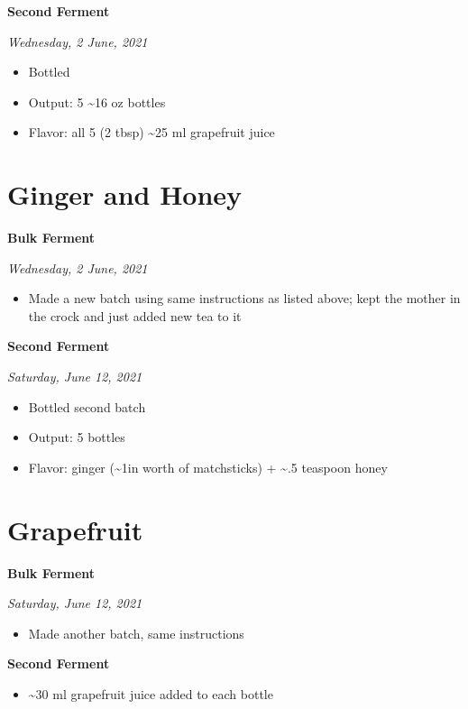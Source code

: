 \documentclass[
]{book}
\providecommand{\tightlist}{%
  \setlength{\itemsep}{0pt}\setlength{\parskip}{0pt}}
\begin{document}
\textbf{Second Ferment}

\emph{Wednesday, 2 June, 2021}

\begin{itemize}
\tightlist
\item
  Bottled
\item
  Output: 5 \textasciitilde16 oz bottles
\item
  Flavor: all 5 (2 tbsp) \textasciitilde25 ml grapefruit juice
\end{itemize}

\hypertarget{ginger-and-honey}{%
\section{Ginger and Honey}\label{ginger-and-honey}}

\textbf{Bulk Ferment}

\emph{Wednesday, 2 June, 2021}

\begin{itemize}
\tightlist
\item
  Made a new batch using same instructions as listed above; kept the mother in the crock and just added new tea to it
\end{itemize}

\textbf{Second Ferment}

\emph{Saturday, June 12, 2021}

\begin{itemize}
\tightlist
\item
  Bottled second batch
\item
  Output: 5 bottles
\item
  Flavor: ginger (\textasciitilde1in worth of matchsticks) + \textasciitilde.5 teaspoon honey
\end{itemize}

\hypertarget{grapefruit-1}{%
\section{Grapefruit}\label{grapefruit-1}}

\textbf{Bulk Ferment}

\emph{Saturday, June 12, 2021}

\begin{itemize}
\tightlist
\item
  Made another batch, same instructions
\end{itemize}

\textbf{Second Ferment}

\begin{itemize}
\tightlist
\item
  \textasciitilde30 ml grapefruit juice added to each bottle
\end{itemize}
\end{document}
